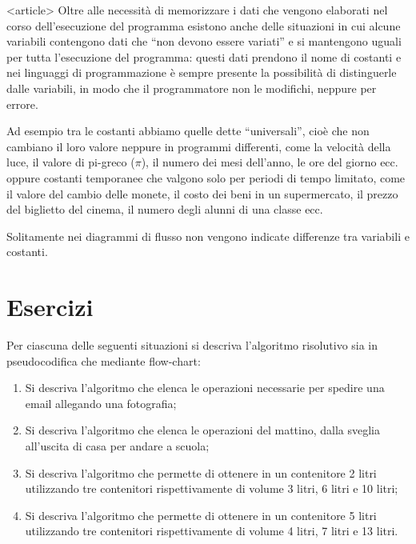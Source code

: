 \documentclass[
    notheorems,
    11pt,
    compress,
    aspectratio=169
]{beamer}
\begin{document}
\begin{frame}<article>
    Oltre alle necessità di memorizzare i dati che vengono elaborati nel corso dell’esecuzione del programma esistono anche delle situazioni in cui alcune variabili contengono dati che “non devono essere variati” e si mantengono uguali per tutta l’esecuzione del programma: questi dati prendono il nome di costanti e nei linguaggi di programmazione è sempre presente la possibilità di distinguerle dalle variabili, in modo che il programmatore non le modifichi, neppure per errore.

    \vspace{\baselineskip}

    Ad esempio tra le costanti abbiamo quelle dette “universali”, cioè che non cambiano il loro valore neppure in programmi differenti, come la velocità della luce, il valore di pi-greco (\(\pi\)), il numero dei mesi dell’anno, le ore del giorno ecc. oppure costanti temporanee che valgono solo per periodi di tempo limitato, come il valore del cambio delle monete, il costo dei beni in un supermercato, il prezzo del biglietto del cinema, il numero degli alunni di una classe ecc.

    \vspace{\baselineskip}

    Solitamente nei diagrammi di flusso non vengono indicate differenze tra variabili e costanti.
\end{frame}



\section{Esercizi}

\begin{frame}

    Per ciascuna delle seguenti situazioni si descriva l’algoritmo risolutivo sia in pseudocodifica che mediante flow-chart:

    \begin{enumerate}
        \item Si descriva l’algoritmo che elenca le operazioni necessarie per spedire una email allegando una fotografia;

        \item Si descriva l’algoritmo che elenca le operazioni del mattino, dalla sveglia all’uscita di casa per andare a scuola;

        \item Si descriva l’algoritmo che permette di ottenere in un contenitore 2 litri utilizzando tre contenitori rispettivamente di volume 3 litri, 6 litri e 10 litri;

        \item Si descriva l’algoritmo che permette di ottenere in un contenitore 5 litri utilizzando tre contenitori rispettivamente di volume 4 litri, 7 litri e 13 litri.
    \end{enumerate}
\end{frame}


\begin{frame}
    
    \printbibliography
\end{frame}

\end{document}
